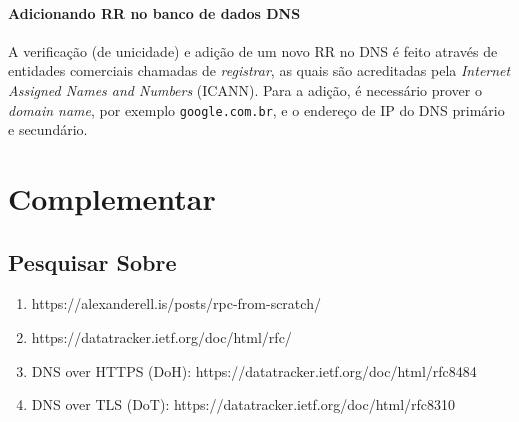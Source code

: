 \hypertarget{adicionando-rr-no-banco-de-dados-dns}{%
\paragraph{Adicionando RR no banco de dados
DNS}\label{adicionando-rr-no-banco-de-dados-dns}}

A verificação (de unicidade) e adição de um novo RR no DNS é feito
através de entidades comerciais chamadas de \emph{registrar}, as quais
são acreditadas pela \emph{Internet Assigned Names and Numbers} (ICANN).
Para a adição, é necessário prover o \emph{domain name}, por exemplo
\texttt{google.com.br}, e o endereço de IP do DNS primário e secundário.

\hypertarget{complementar-4}{%
\section{Complementar}\label{complementar-4}}

\hypertarget{pesquisar-sobre-3}{%
\subsection{Pesquisar Sobre}\label{pesquisar-sobre-3}}

\begin{enumerate}
\def\labelenumi{\arabic{enumi}.}
\tightlist
\item
  https://alexanderell.is/posts/rpc-from-scratch/
\item
  https://datatracker.ietf.org/doc/html/rfc/
\item
  DNS over HTTPS (DoH): https://datatracker.ietf.org/doc/html/rfc8484
\item
  DNS over TLS (DoT): https://datatracker.ietf.org/doc/html/rfc8310
\end{enumerate}